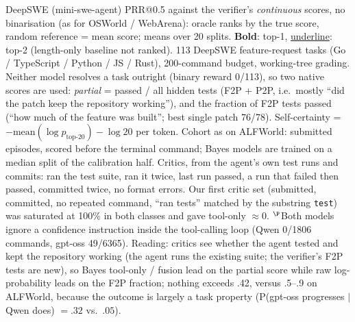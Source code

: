 \documentclass[10pt, aspectratio=43]{beamer}
\begin{document}
\begin{frame}{DeepSWE (mini-swe-agent)}
\vspace{0.25em}
\fontsize{6}{7}\selectfont
PRR@0.5 against the verifier's \emph{continuous} scores, no binarisation (as for OSWorld /
WebArena): oracle ranks by the true score, random reference = mean score; means over 20
splits. \textbf{Bold}: top-1, \underline{underline}: top-2 (length-only baseline not ranked).
113 DeepSWE feature-request tasks (Go / TypeScript / Python / JS / Rust), 200-command budget,
working-tree grading. Neither model resolves a task outright (binary reward 0/113), so two
native scores are used: \emph{partial} = passed / all hidden tests (F2P + P2P, i.e.\ mostly
``did the patch keep the repository working''), and the fraction of F2P tests passed
(``how much of the feature was built''; best single patch 76/78). Self-certainty = $-\mathrm{mean}(\log p_{\text{top-20}})-\log 20$ per token. Cohort as on ALFWorld:
submitted episodes, scored before the terminal command; Bayes models are trained on a
median split of the calibration half. Critics, from the agent's own test runs and commits:
ran the test suite, ran it twice, last run passed, a run that failed then passed, committed
twice, no format errors. Our first critic set (submitted, committed, no repeated command,
``ran tests'' matched by the substring \texttt{test}) was saturated at 100\% in both
classes and gave tool-only $\approx 0$.
$^\P$Both models ignore a confidence instruction inside the tool-calling loop
(Qwen 0/1806 commands, gpt-oss 49/6365).
Reading: critics see whether the agent tested and kept the repository working (the agent
runs the existing suite; the verifier's F2P tests are new), so Bayes tool-only / fusion lead
on the partial score while raw log-probability leads on the F2P fraction; nothing exceeds
.42, versus .5--.9 on ALFWorld, because the outcome is largely a task property
(P(gpt-oss progresses $\mid$ Qwen does) $=.32$ vs.\ $.05$).
\end{frame}


\end{document}
